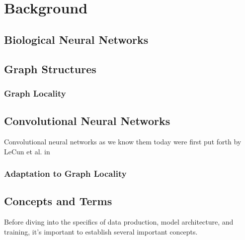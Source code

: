 
\chapter{Background}

\section{Biological Neural Networks}


\section{Graph Structures}

\subsection{Graph Locality}

\section{Convolutional Neural Networks}
Convolutional neural networks as we know them today were first put forth by 
LeCun et al. in 

\subsection{Adaptation to Graph Locality}


\section{Concepts and Terms}
Before diving into the specifics of data production, model architecture, and 
training, it's important to establish several important concepts.

